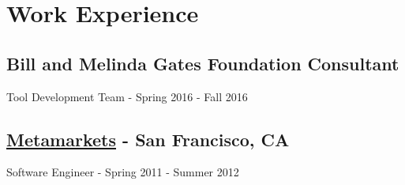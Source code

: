 \documentclass[oneside]{article}
\begin{document}


\newpage
\section{Work Experience}

  \subsection{Bill and Melinda Gates Foundation Consultant}

  Tool Development Team - Spring 2016 - Fall 2016

  \subsection{\href{http://metamarkets.com/}{Metamarkets} - San Francisco, CA}

    Software Engineer - Spring 2011 - Summer 2012
\end{document}
